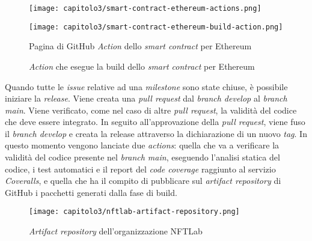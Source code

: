 \begin{figure}[tbph!]
  \captionsetup{singlelinecheck = false, format= hang, justification=raggedright, font=footnotesize, labelsep=space}
  
  \centering

  \begin{minipage}{0.711\textwidth}
    \texttt{[image: capitolo3/smart-contract-ethereum-actions.png]}
  \end{minipage}%
  \begin{minipage}{0.289\textwidth}
    \texttt{[image: capitolo3/smart-contract-ethereum-build-action.png]}
  \end{minipage}

  \begin{minipage}[t]{0.7\textwidth}
    \caption{Pagina di GitHub \textit{Action} dello \textit{smart contract} per Ethereum}
  \end{minipage}%
  \begin{minipage}[t]{0.3\textwidth}
    \caption{\textit{Action} che esegue la build dello \textit{smart contract} per Ethereum}
  \end{minipage}
\end{figure}

Quando tutte le \textit{issue} relative ad una \textit{milestone} sono state chiuse, è possibile iniziare la \textit{release}. Viene creata una \textit{pull request} dal \textit{branch develop} al \textit{branch main}. Viene verificato, come nel caso di altre \textit{pull request}, la validità del codice che deve essere integrato. In seguito all'approvazione della \textit{pull request}, viene fuso il \textit{branch develop} e creata la release attraverso la dichiarazione di un nuovo \textit{tag}. In questo momento vengono lanciate due \textit{actions}: quella che va a verificare la validità del codice presente nel \textit{branch main}, eseguendo l'analisi statica del codice, i test automatici e il report del \textit{code coverage} raggiunto al servizio \textit{Coveralls}, e quella che ha il compito di pubblicare sul \textit{artifact repository} di GitHub i pacchetti generati dalla fase di build.

\begin{figure}[h!]
  \centering
  \texttt{[image: capitolo3/nftlab-artifact-repository.png]}
  \caption{\textit{Artifact repository} dell'organizzazione NFTLab}
\end{figure}
